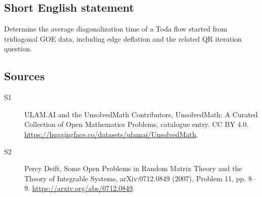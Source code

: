 \documentclass[11pt]{article}
\begin{document}
\subsection{Short English statement}
Determine the average diagonalization time of a Toda flow started from tridiagonal GOE data, including edge deflation and the related QR iteration question.
\subsection{Sources}
\begin{description}
\item[\hypertarget{source:statement:1}{S1}] ULAM.AI and the UnsolvedMath Contributors, UnsolvedMath: A Curated Collection of Open Mathematics Problems, catalogue entry. CC BY 4.0. \url{https://huggingface.co/datasets/ulamai/UnsolvedMath}.
\item[\hypertarget{source:statement:2}{S2}] Percy Deift, Some Open Problems in Random Matrix Theory and the Theory of Integrable Systems, arXiv:0712.0849 (2007), Problem 11, pp. 8--9. \url{https://arxiv.org/abs/0712.0849}.
\end{description}
\label{end:statement}
\end{document}
